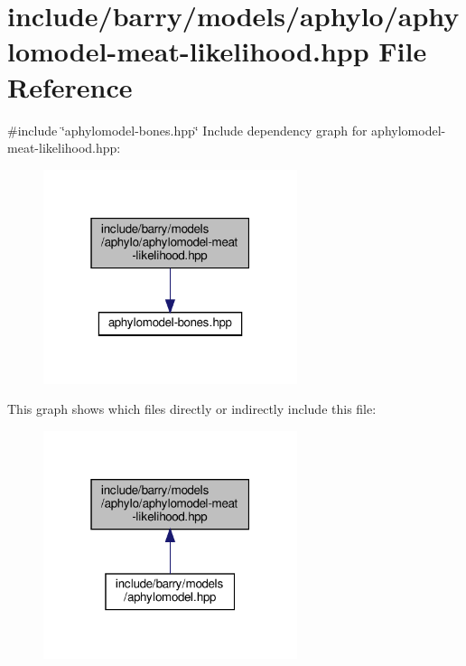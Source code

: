 \hypertarget{aphylomodel-meat-likelihood_8hpp}{}\section{include/barry/models/aphylo/aphylomodel-\/meat-\/likelihood.hpp File Reference}
\label{aphylomodel-meat-likelihood_8hpp}
{\ttfamily \#include \char`\"{}aphylomodel-\/bones.\+hpp\char`\"{}}\newline
Include dependency graph for aphylomodel-\/meat-\/likelihood.hpp\+:
\nopagebreak
\begin{figure}[H]
\begin{center}
\leavevmode
\includegraphics[width=211pt]{aphylomodel-meat-likelihood_8hpp__incl}
\end{center}
\end{figure}
This graph shows which files directly or indirectly include this file\+:
\nopagebreak
\begin{figure}[H]
\begin{center}
\leavevmode
\includegraphics[width=211pt]{aphylomodel-meat-likelihood_8hpp__dep__incl}
\end{center}
\end{figure}

